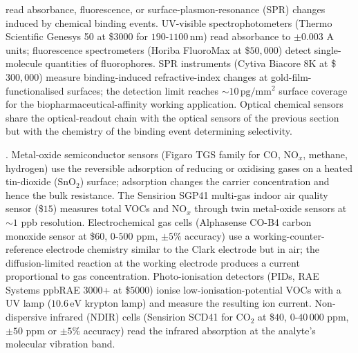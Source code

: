  read absorbance, fluorescence,
or surface-plasmon-resonance (SPR) changes induced by chemical
binding events. UV-visible spectrophotometers (Thermo Scientific
Genesys 50 at \$$3000$ for $190$-$1100\,\si{\nano\meter}$) read
absorbance to $\pm 0.003$ A units; fluorescence spectrometers
(Horiba FluoroMax at \$$50{,}000$) detect single-molecule
quantities of fluorophores. SPR instruments (Cytiva Biacore 8K at
\$$300{,}000$) measure binding-induced refractive-index changes
at gold-film-functionalised surfaces; the detection limit reaches
$\sim 10\,\si{\pico\gram\per\milli\meter\squared}$ surface
coverage for the biopharmaceutical-affinity working application.
Optical chemical sensors share the optical-readout chain with
the optical sensors of the previous section but with the chemistry
of the binding event determining selectivity.

. Metal-oxide semiconductor
sensors (Figaro TGS family for $\mathrm{CO}$, $\mathrm{NO}_{x}$,
methane, hydrogen) use the reversible adsorption of reducing or
oxidising gases on a heated tin-dioxide ($\mathrm{SnO}_{2}$)
surface; adsorption changes the carrier concentration and hence
the bulk resistance. The Sensirion SGP41 multi-gas indoor air
quality sensor (\$$15$) measures total VOCs and $\mathrm{NO}_{x}$
through twin metal-oxide sensors at $\sim 1$ ppb resolution.
Electrochemical gas cells (Alphasense CO-B4 carbon monoxide
sensor at \$$60$, $0$-$500$ ppm, $\pm 5\%$ accuracy) use a
working-counter-reference electrode chemistry similar to the
Clark electrode but in air; the diffusion-limited reaction at the
working electrode produces a current proportional to gas
concentration. Photo-ionisation detectors (PIDs, RAE Systems
ppbRAE 3000+ at \$$5000$) ionise low-ionisation-potential VOCs
with a UV lamp ($10.6\,\si{\electronvolt}$ krypton lamp) and
measure the resulting ion current. Non-dispersive infrared (NDIR)
cells (Sensirion SCD41 for $\mathrm{CO}_{2}$ at \$$40$,
$0$-$40\,000$ ppm, $\pm 50$ ppm or $\pm 5\%$ accuracy) read the
infrared absorption at the analyte's molecular vibration band.


